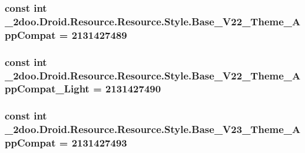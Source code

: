 \hypertarget{class__2doo_1_1_droid_1_1_resource_1_1_style_661ebcf3d56295e184112635ac4f0ed9}{
\subsubsection[{Base\_\-V22\_\-Theme\_\-AppCompat}]{\setlength{\rightskip}{0pt plus 5cm}const int \_\-2doo.Droid.Resource.Resource.Style.Base\_\-V22\_\-Theme\_\-AppCompat = 2131427489}}
\label{class__2doo_1_1_droid_1_1_resource_1_1_style_661ebcf3d56295e184112635ac4f0ed9}


\hypertarget{class__2doo_1_1_droid_1_1_resource_1_1_style_6e84a61f8aa07effc5b12877e4c410e4}{
\subsubsection[{Base\_\-V22\_\-Theme\_\-AppCompat\_\-Light}]{\setlength{\rightskip}{0pt plus 5cm}const int \_\-2doo.Droid.Resource.Resource.Style.Base\_\-V22\_\-Theme\_\-AppCompat\_\-Light = 2131427490}}
\label{class__2doo_1_1_droid_1_1_resource_1_1_style_6e84a61f8aa07effc5b12877e4c410e4}


\hypertarget{class__2doo_1_1_droid_1_1_resource_1_1_style_e751d491be132b949028b45a9c1423e5}{
\subsubsection[{Base\_\-V23\_\-Theme\_\-AppCompat}]{\setlength{\rightskip}{0pt plus 5cm}const int \_\-2doo.Droid.Resource.Resource.Style.Base\_\-V23\_\-Theme\_\-AppCompat = 2131427493}}
\label{class__2doo_1_1_droid_1_1_resource_1_1_style_e751d491be132b949028b45a9c1423e5}


